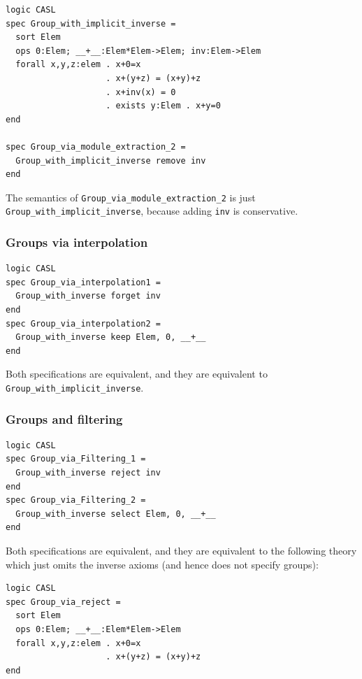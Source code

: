\documentclass[10pt,fleqn,%
\ifpretendfinal
final%
\else
draft%
\fi,
]{scrreprt}
\newcommand*{\syntax}[1]{\texttt{#1}}
\newcommand{\sssclause}[1]{\subsubsection{#1}}
\begin{document}
\begin{lstlisting}[basicstyle=\ttfamily,language=dolText,morekeywords={props,ObjectProperty,Class,DisjointUnionOf,SubClassOf,Characteristics,Transitive,Asymmetric,SubPropertyOf,DisjointClasses,EquivalentTo,inverse,only,forall,iff,if,or,exists,sort,ops,spec,forget},escapechar=@,mathescape]
logic CASL
spec Group_with_implicit_inverse =
  sort Elem
  ops 0:Elem; __+__:Elem*Elem->Elem; inv:Elem->Elem
  forall x,y,z:elem . x+0=x
                    . x+(y+z) = (x+y)+z
                    . x+inv(x) = 0
                    . exists y:Elem . x+y=0
end

spec Group_via_module_extraction_2 =
  Group_with_implicit_inverse remove inv
end
\end{lstlisting}
The semantics of \syntax{Group\_via\_module\_extraction\_2} is just
\syntax{Group\_with\_implicit\_inverse}, because adding \texttt{inv}
is conservative.
\medskip

\sssclause{Groups via interpolation}

\begin{lstlisting}[basicstyle=\ttfamily,language=dolText,morekeywords={props,ObjectProperty,Class,DisjointUnionOf,SubClassOf,Characteristics,Transitive,Asymmetric,SubPropertyOf,DisjointClasses,EquivalentTo,inverse,only,forall,iff,if,or,exists,sort,ops,spec,forget},escapechar=@,mathescape]
logic CASL
spec Group_via_interpolation1 =
  Group_with_inverse forget inv
end
spec Group_via_interpolation2 =
  Group_with_inverse keep Elem, 0, __+__
end
\end{lstlisting}
Both specifications are equivalent, and they 
are equivalent to \syntax{Group\_with\_implicit\_inverse}.
\medskip

\sssclause{Groups and filtering}
\begin{lstlisting}[basicstyle=\ttfamily,language=dolText,morekeywords={props,ObjectProperty,Class,DisjointUnionOf,SubClassOf,Characteristics,Transitive,Asymmetric,SubPropertyOf,DisjointClasses,EquivalentTo,inverse,only,forall,iff,if,or,exists,sort,ops,spec,forget},escapechar=@,mathescape]
logic CASL
spec Group_via_Filtering_1 =
  Group_with_inverse reject inv
end
spec Group_via_Filtering_2 =
  Group_with_inverse select Elem, 0, __+__
end
\end{lstlisting}
Both specifications are equivalent, and they are equivalent 
to the following theory which just omits the inverse
axioms (and hence does not specify groups):
\begin{lstlisting}[basicstyle=\ttfamily,language=dolText,morekeywords={props,ObjectProperty,Class,DisjointUnionOf,SubClassOf,Characteristics,Transitive,Asymmetric,SubPropertyOf,DisjointClasses,EquivalentTo,inverse,only,forall,iff,if,or,exists,sort,ops,spec,forget},escapechar=@,mathescape]
logic CASL
spec Group_via_reject =
  sort Elem
  ops 0:Elem; __+__:Elem*Elem->Elem
  forall x,y,z:elem . x+0=x
                    . x+(y+z) = (x+y)+z
end
\end{lstlisting}
\end{document}
